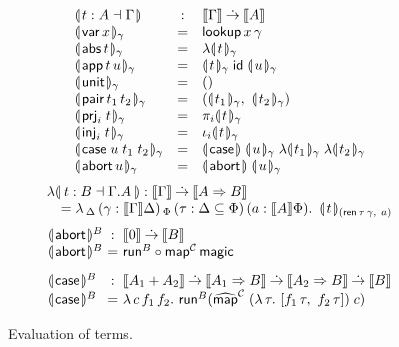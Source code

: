 \documentclass[sigconf,screen,fleqn]{acmart} %
\begin{document}
\begin{figure}[htbp]
\hrulefill
\[
\begin{array}{lcl}
  \denty {t : A \from \Gamma}  & : & \den \Gamma \todot \den A \\
  \dent{\tvar\,x}\gamma & = & \tlookup\,x\,\gamma \\
  \dent{\tabs\,t}\gamma & = & \fdent t \gamma \\
  \dent{\tapp\,t\,u} \gamma & = &
     \dent t \gamma\;\tid\;\dent u \gamma \\
  \dent{\tunit}\gamma & = & \ttempty \\
  \dent{\tpair\,t_1\,t_2}\gamma & = &
    (\dent{t_1}\gamma,\ \dent{t_2}\gamma) \\
  \dent{\prj i t}\gamma & = & \pi_i \dent t \gamma \\
  \dent{\inj i t}\gamma & = & \iota_i \dent t \gamma \\
  \dent{\tcase\;u\;t_1\;t_2}\gamma & = &
     \dencase\;\dent u \gamma\;\fdent{t_1}\gamma\;\fdent{t_2}\gamma \\
  \dent{\tabort\,u}\gamma & = & \denabort\;\dent u \gamma \\
\end{array}
\]
\dotfill
\[
\begin{array}{l}
  \fden{t : B \from \cext \Gamma A}
    : \den \Gamma \todot \den{A \To B} \\
    \quad =
      \lambda\,_\Delta\, (\gamma : \den \Gamma \Delta)
      \,_\Phi
      \,(\tau : \Delta \sublist \Phi)
      \,(a : \den A \Phi)
      .\ \,
      \dent t {(\tren\,\tau\,\gamma,\ a)} \\
\end{array}
\]
\dotfill
\[
\begin{array}{l@{~}c@{~}l}
  \denabort^B & : & \den \tyzero \todot \den B \\
  \denabort^B & = & \trun^B \comp \tmap[\C]\,\tmagic
\\[2ex]
  \dencase^B  & : & \den{A_1 + A_2}
    \todot \den{A_1 \To B}
    \todot \den{A_2 \To B}
    \todot \den{B} \\
  \dencase^B & = & \lambda\,c\,f_1\,f_2.\
    \trun^B (\stmap[\C]\;(\lambda\,\tau.\ [f_1\,\tau,\ f_2\,\tau])\;c) \\
\end{array}
\]
\hrulefill
  \caption{Evaluation of terms.}
  \label{fig:eval}
\end{figure}
\end{document}
